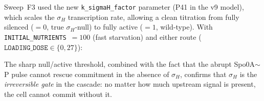 \documentclass[11pt,a4paper]{article}
\begin{document}
Sweep~F3 used the new \texttt{k\_sigmaH\_factor} parameter (P41 in the
v9 model), which scales the $\sigma_H$ transcription rate, allowing a
clean titration from fully silenced ($= 0$, true $\sigma_H$-null) to
fully active ($= 1$, wild-type).  With \texttt{INITIAL\_NUTRIENTS}~$= 100$
(fast starvation) and either route ($\texttt{LOADING\_DOSE} \in \{0, 27\}$):
The sharp null/active threshold, combined with the fact that the
abrupt Spo0A$\sim$P pulse cannot rescue commitment in the absence of
$\sigma_H$, confirms that $\sigma_H$ is the \emph{irreversible gate}
in the cascade: no matter how much upstream signal is present, the cell
cannot commit without it.
\end{document}
